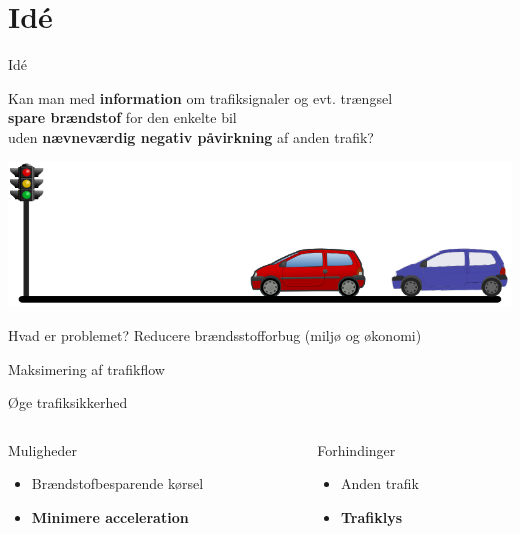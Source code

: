 \section{Idé}

\begin{frame}{Idé}
\begin{center}
Kan man med \textbf{information} om trafiksignaler og evt. trængsel\\\textbf{spare brændstof} for den enkelte bil\\uden \textbf{nævneværdig negativ påvirkning} af anden trafik?
\end{center}
\includegraphics[width=1\textwidth]{../images/idea.png}
\end{frame}

\begin{frame}{Hvad er problemet?}
Reducere brændsstofforbug (miljø og økonomi)

Maksimering af trafikflow

Øge trafiksikkerhed

\vspace{5mm}
\begin{columns}
\begin{column}{0.5\textwidth}
Muligheder
\begin{itemize}
\item Brændstofbesparende kørsel
\item \textbf{Minimere acceleration}
\end{itemize}

\end{column}
\begin{column}{0.4\textwidth}
Forhindinger
\begin{itemize}
\item Anden trafik
\item \textbf{Trafiklys}
\end{itemize}
\end{column}
\end{columns}
\end{frame}

